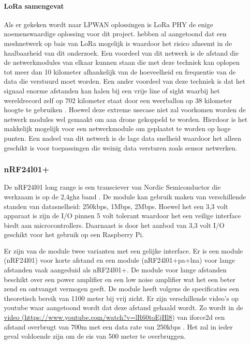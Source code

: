 \documentclass[a4paper, 11pt, oneside]{report}
\begin{document}
\paragraph*{LoRa samengevat}
Als er gekeken wordt naar LPWAN oplossingen is LoRa PHY de enige noemenswaardige oplossing voor dit project.
 hebben al aangetoond dat een meshnetwerk op bais van LoRa mogelijk is waardoor het risico afneemt in de haalbaarheid van dit onderzoek.
Een voordeel van dit netwerk is de afstand die de netwerkmodules van elkaar kunnen staan die met deze techniek kan oplopen tot meer dan 10 kilometer afhankelijk van de hoeveelheid en frequentie van de data die verstuurd moet worden.
Een ander voordeel van deze techniek is dat het signaal enorme afstanden kan halen bij een vrije line of sight waarbij het wereldrecord zelf op 702 kilometer staat door een weerballon op 38 kilometer hoogte te gebruiken \cite{LoRARecord}.
Hoewel deze extreme usecase niet zal voorkomen worden de netwerk modules wel gemaakt om aan drone gekoppeld te worden.
Hierdoor is het makkelijk mogelijk voor een netwerkmodule om geplaatst te worden op hoge punten. 
Een nadeel van dit netwerk is de lage data snelheid waardoor het alleen geschikt is voor toepassingen die weinig data versturen zoals sensor netwerken.

\subsubsection{nRF24l01+}\label{sec:nrf24l01}
De nRF24l01 long range is een transciever van Nordic Semiconductor die werkzaam is op de 2,4ghz band \cite{nRFspec}.
De module kan gebruik maken van verschillende standen van datasnelheid: 250kbps, 1Mbps, 2Mbps.
Hoewel het een 3,3 volt apparaat is zijn de I/O pinnen 5 volt tolerant waardoor het een veilige interface biedt aan microcontrollers. Daarnaast is door het aanbod van 3,3 volt I/O geschikt voor het gebruik op een Raspberry Pi.

Er zijn van de module twee varianten met een gelijke interface. 
Er is een module (nRF24l01) voor korte afstand en een module (nRF24l01+pa+lna) voor lange afstanden vaak aangeduid als nRF24l01+.
De module voor lange afstanden beschikt over een power amplifier en een low noise amplifier wat het een beter zend en ontvangst vermogen geeft.
De module heeft volgens de specificaties een theoretisch bereik van 1100 meter bij vrij zicht.
Er zijn verschillende video's op youtube waar aangetoond wordt dat deze afstand gehaald wordt.
Zo wordt in de \href{https://www.youtube.com/watch?v=lR60toEjHl8}{video (https://www.youtube.com/watch?v=lR60toEjHl8}) van iforce2d een afstand overbrugt van 700m met een data rate van 250kbps \cite{nrfAfstand}.
Het zal in ieder geval voldoende zijn om de eis van 500 meter te overbruggen.  
\end{document}
